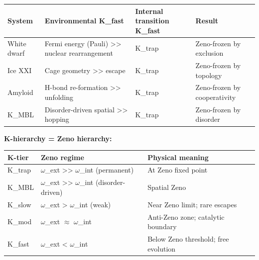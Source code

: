 \documentclass[12pt,a4paper]{article}
\begin{document}
\begin{table}[htbp]
\centering
\small
{}
\begin{tabularx}{\textwidth}{>{\centering\arraybackslash}X >{\centering\arraybackslash}X >{\centering\arraybackslash}X >{\centering\arraybackslash}X}
\toprule
\rowcolor{gray!25}\textbf{System} & \textbf{Environmental K\_fast} & \textbf{Internal transition K\_fast} & \textbf{Result} \\
\midrule
\rowcolors{1}{white}{gray!10}
White dwarf & Fermi energy (Pauli) \textgreater{}\textgreater{} nuclear rearrangement & K\_trap & Zeno-frozen by exclusion \\
Ice XXI & Cage geometry \textgreater{}\textgreater{} escape & K\_trap & Zeno-frozen by topology \\
Amyloid & H-bond re-formation \textgreater{}\textgreater{} unfolding & K\_trap & Zeno-frozen by cooperativity \\
K\_MBL & Disorder-driven spatial \textgreater{}\textgreater{} hopping & K\_trap & Zeno-frozen by disorder \\
\bottomrule
\end{tabularx}
\end{table}

\textbf{K-hierarchy = Zeno hierarchy:}

\begin{table}[htbp]
\centering
\small
{}
\begin{tabularx}{\textwidth}{>{\centering\arraybackslash}X >{\centering\arraybackslash}X >{\centering\arraybackslash}X}
\toprule
\rowcolor{gray!25}\textbf{K-tier} & \textbf{Zeno regime} & \textbf{Physical meaning} \\
\midrule
\rowcolors{1}{white}{gray!10}
K\_trap & $\omega$\_ext \textgreater{}\textgreater{} $\omega$\_int (permanent) & At Zeno fixed point \\
K\_MBL & $\omega$\_ext \textgreater{}\textgreater{} $\omega$\_int (disorder-driven) & Spatial Zeno \\
K\_slow & $\omega$\_ext \textgreater{} $\omega$\_int (weak) & Near Zeno limit; rare escapes \\
K\_mod & $\omega$\_ext $\approx$ $\omega$\_int & Anti-Zeno zone; catalytic boundary \\
K\_fast & $\omega$\_ext \textless{} $\omega$\_int & Below Zeno threshold; free evolution \\
\bottomrule
\end{tabularx}
\end{table}
\end{document}

